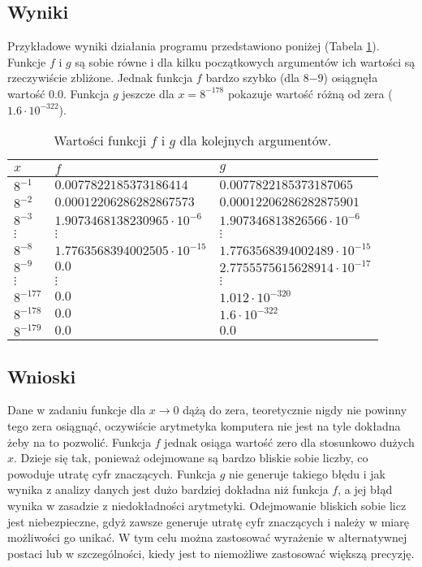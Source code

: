 \documentclass[11pt,a4paper]{article}
\begin{document}
\subsection{Wyniki}
Przykładowe wyniki działania programu przedstawiono poniżej (Tabela \ref{table:7}). Funkcje $f$ i $g$ są sobie równe i dla kilku początkowych argumentów ich wartości są rzeczywiście zbliżone. Jednak funkcja $f$ bardzo szybko (dla $8{-9}$) osiągnęła wartość $0.0$. Funkcja $g$ jeszcze dla $x = 8^{-178}$ pokazuje wartość różną od zera ($1.6\cdot 10^{-322}$).
\begin{table}[!h]
\centering
\begin{tabular}{l | l | l}
$x$ & $f$ & $g$ \\ \hline
$8^{-1}$ & $0.0077822185373186414$ & $0.0077822185373187065$ \\
$8^{-2}$ & $0.00012206286282867573$ & $0.00012206286282875901$ \\
$8^{-3}$ & $1.9073468138230965\cdot 10^{-6}$ & $1.907346813826566\cdot 10^{-6}$ \\
$\vdots$ & $\vdots$ & $\vdots$ \\
$8^{-8}$ & $1.7763568394002505\cdot 10^{-15}$ & $1.7763568394002489\cdot 10^{-15}$ \\
$8^{-9}$ & $0.0$ & $2.7755575615628914\cdot 10^{-17}$ \\
$\vdots$ & $\vdots$ & $\vdots$ \\
$8^{-177}$ & $0.0$ & $1.012\cdot 10^{-320}$ \\
$8^{-178}$ & $0.0$ & $1.6\cdot 10^{-322}$ \\
$8^{-179}$ & $0.0$ & $0.0$ \\
\end{tabular}
\caption{\label{table:7}Wartości funkcji $f$ i $g$ dla kolejnych argumentów.}
\end{table}
\subsection{Wnioski}
Dane w zadaniu funkcje dla $x\rightarrow 0$ dążą do zera, teoretycznie nigdy nie powinny tego zera osiągnąć, oczywiście arytmetyka komputera nie jest na tyle dokładna żeby na to pozwolić. Funkcja $f$ jednak osiąga wartość zero dla stosunkowo dużych $x$. Dzieje się tak, ponieważ odejmowane są bardzo bliskie sobie liczby, co powoduje utratę cyfr znaczących. Funkcja $g$ nie generuje takiego błędu i jak wynika z analizy danych jest dużo bardziej dokładna niż funkcja $f$, a jej błąd wynika w zasadzie z niedokładności arytmetyki. Odejmowanie bliskich sobie licz jest niebezpieczne, gdyż zawsze generuje utratę cyfr znaczących i należy w miarę możliwości go unikać. W tym celu można zastosować wyrażenie w alternatywnej postaci lub w szczególności, kiedy jest to niemożliwe zastosować większą precyzję.
\end{document}
